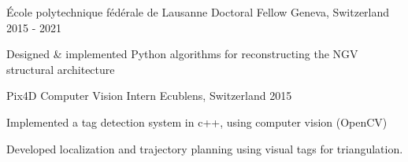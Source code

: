 \begin{cventries}


\cventry
{École polytechnique fédérale de Lausanne}
{Doctoral Fellow}
{Geneva, Switzerland}
{2015 - 2021}
{
\begin{cvitems}
\item{Designed \& implemented Python algorithms for reconstructing the NGV structural architecture}
\end{cvitems}
}



\cventry
{Pix4D} %
{Computer Vision Intern} %
{Ecublens, Switzerland} %
{2015 } %
{ %
\begin{cvitems}
\item {Implemented a tag detection system in c++, using computer vision (OpenCV)}
\item {Developed localization and trajectory planning using visual tags for triangulation.}
\end{cvitems}
}


\end{cventries}
